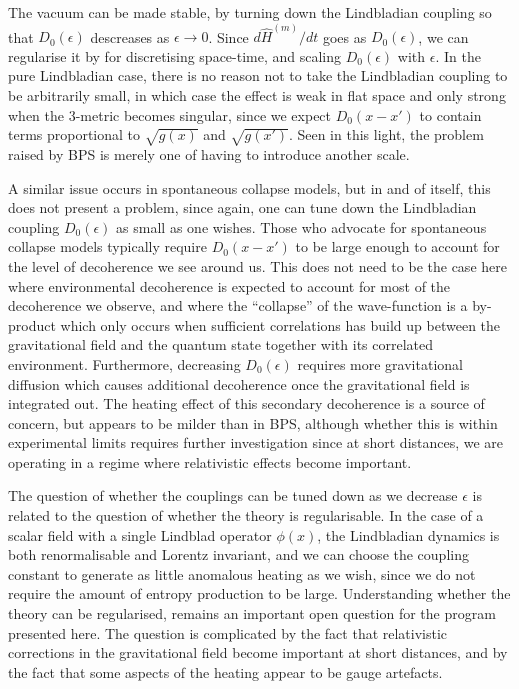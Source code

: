 \documentclass[aps,pra,showpacs,citeautoscript,amsmath,amssymb,floatfix,superscriptaddress,bbm, verbatim,amsfonts,changes,10pt,nofootinbib,longbibliography]{revtex4-1}
\def\qmatterham{\hat{H}^{(m)}}
\begin{document}
The vacuum can be made stable, by turning down the Lindbladian coupling so that $D_0(\epsilon)$ descreases as $\epsilon\rightarrow 0$. Since $d{\qmatterham}/dt$ goes as $D_0(\epsilon)$, we can regularise it by for discretising space-time, and scaling $D_0(\epsilon)$ with $\epsilon$. 
In the pure Lindbladian case, there is no reason not to take the Lindbladian coupling to be arbitrarily small, in which case the effect is weak in flat space and only strong when the 3-metric becomes singular, since we expect $D_0(x-x')$ to contain terms proportional to $\sqrt{g(x)}$ and $\sqrt{g(x')}$. Seen in this light, the problem raised by BPS is merely one of having to introduce another scale.

A similar issue occurs in spontaneous collapse models\cite{ballentine1991failure,gallis1991comparison,shimony1990desiderata}, but in and of itself, this does not present a problem, since again, one can tune down the Lindbladian coupling $D_0(\epsilon)$ as small as one wishes. Those who advocate for spontaneous collapse models typically require $D_0(x-x')$ to be large enough to account for the level of decoherence we see around us. This does not need to be the case here where environmental decoherence is expected to account for most of the decoherence we observe, and where the ``collapse'' of the wave-function is a by-product which only occurs when sufficient correlations has build up between the gravitational field and the quantum state together with its correlated environment. Furthermore, decreasing $D_0(\epsilon)$ requires more gravitational diffusion\cite{oppenheim2021gravitationally} which causes additional decoherence once the gravitational field is integrated out\cite{tilloy2016sourcing,UCLcoherence}. The heating effect of this secondary decoherence is a source of concern, but appears to be milder than in BPS\cite{UCLcoherence,oppenheim2021gravitationally}, although whether this is within experimental limits requires further investigation since at short distances, we are operating in a regime where relativistic effects become important.


The question of whether the couplings can be tuned down as we decrease $\epsilon$ is related to the question of whether the theory is regularisable\cite{oppenheim2023path}. 
In the case of a scalar field with a single Lindblad operator $\phi(x)$, the Lindbladian dynamics is both renormalisable and Lorentz invariant\cite{baidya2017renormalization,UCLLorentz}, and we can choose the coupling constant to generate as little anomalous heating as we wish, since we do not require the amount of entropy production to be large.
 Understanding whether the theory can be regularised, remains an important open question for the program presented here. The question is complicated by the fact that relativistic corrections in the gravitational field become important at short distances\cite{UCLDMDNE}, and by the fact that some aspects of the heating appear to be gauge artefacts\cite{layton2023weak}. %
\end{document}
